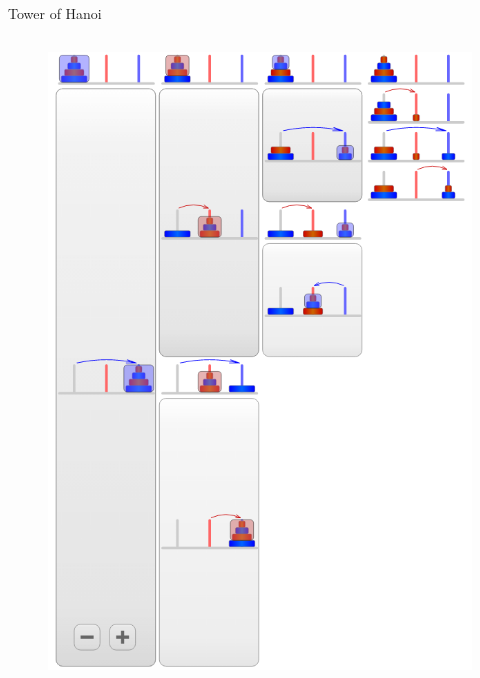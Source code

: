 \documentclass{beamer}
\begin{document}
\begin{frame}[fragile]{Tower of Hanoi}
\begin{columns}
    \begin{column}{.4\textwidth}
      \begin{figure}
        \centering
        \includegraphics[scale=0.2]{recursive}
      \end{figure}
    \end{column}
  \end{columns}
\end{frame}
\end{document}
